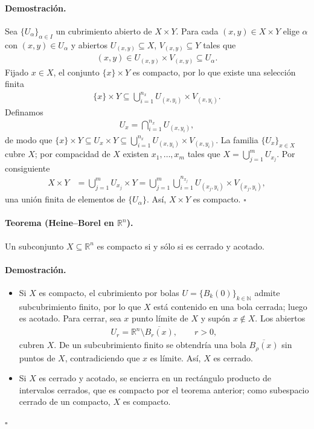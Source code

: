 \paragraph{\textbf{Demostración.}}
Sea $\{U_\alpha\}_{\alpha\in I}$ un cubrimiento abierto de $X\times Y$.  
Para cada $(x,y)\in X\times Y$ elige $\alpha$ con $(x,y)\in U_\alpha$ y abiertos $U_{(x,y)}\subseteq X$, $V_{(x,y)}\subseteq Y$ tales que
\begin{align*}
(x,y)\in U_{(x,y)}\times V_{(x,y)}\subseteq U_\alpha.
\end{align*}
Fijado $x\in X$, el conjunto $\{x\}\times Y$ es compacto, por lo que existe una selección finita
\begin{align*}
\{x\}\times Y\subseteq\bigcup_{i=1}^{n_x}U_{(x,y_i)}\times V_{(x,y_i)}.
\end{align*}
Definamos
\begin{align*}
U_x=\bigcap_{i=1}^{n_x}U_{(x,y_i)},
\end{align*}
de modo que $\{x\}\times Y\subseteq U_x\times Y\subseteq\bigcup_{i=1}^{n_x}U_{(x,y_i)}\times V_{(x,y_i)}$.  
La familia $\{U_x\}_{x\in X}$ cubre $X$; por compacidad de $X$ existen $x_1,\dots,x_m$ tales que $X=\bigcup_{j=1}^{m}U_{x_j}$.  
Por consiguiente
\begin{align*}
X\times Y
&=\bigcup_{j=1}^{m}U_{x_j}\times Y
 =\bigcup_{j=1}^{m}\bigcup_{i=1}^{n_{x_j}}U_{(x_j,y_i)}\times V_{(x_j,y_i)},
\end{align*}
una unión finita de elementos de $\{U_\alpha\}$.  
Así, $X\times Y$ es compacto. \hfill$\square$

\paragraph{\textbf{Teorema (Heine–Borel en $\mathbb R^n$).}}
Un subconjunto $X\subseteq\mathbb R^n$ es compacto si y sólo si es cerrado y acotado.

\paragraph{\textbf{Demostración.}}
\begin{itemize}
  \item[$(\Rightarrow)$] Si $X$ es compacto, el cubrimiento por bolas $U=\{B_k(0)\}_{k\in\mathbb N}$ admite subcubrimiento finito, por lo que $X$ está contenido en una bola cerrada; luego es acotado.  
    Para cerrar, sea $x$ punto límite de $X$ y supón \(x\notin X\).  Los abiertos
    \begin{align*}
      U_r=\mathbb R^n\setminus\overline{B_r(x)},\qquad r>0,
    \end{align*}
    cubren $X$.  De un subcubrimiento finito se obtendría una bola $\overline{B_{\rho}(x)}$ sin puntos de $X$, contradiciendo que $x$ es límite.  Así, $X$ es cerrado.
  \item[$(\Leftarrow)$] Si $X$ es cerrado y acotado, se encierra en un rectángulo producto de intervalos cerrados, que es compacto por el teorema anterior; como subespacio cerrado de un compacto, $X$ es compacto.
\end{itemize}
\hfill$\square$